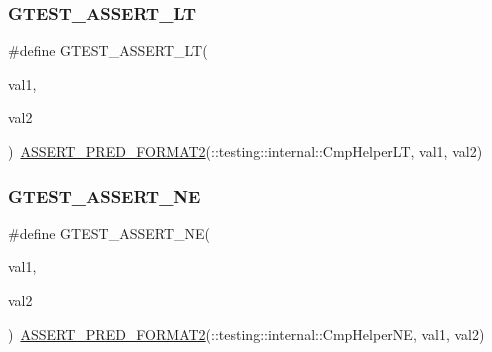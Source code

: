 \mbox{\label{_obj__test_2lib_2googletest-release-1_88_81_2googletest_2include_2gtest_2gtest_8h_a5a75667e637febd18e5f7d4f3abf55e8}} 
\subsubsection{\texorpdfstring{GTEST\_ASSERT\_LT}{GTEST\_ASSERT\_LT}}
{\footnotesize\ttfamily \#define G\+T\+E\+S\+T\+\_\+\+A\+S\+S\+E\+R\+T\+\_\+\+LT(\begin{DoxyParamCaption}\item[{}]{val1,  }\item[{}]{val2 }\end{DoxyParamCaption})~\mbox{\hyperlink{_obj__test_2lib_2googletest-release-1_88_81_2googletest_2include_2gtest_2gtest__pred__impl_8h_ac452685a1a98ea3d96eb956a062ee210}{A\+S\+S\+E\+R\+T\+\_\+\+P\+R\+E\+D\+\_\+\+F\+O\+R\+M\+A\+T2}}(\+::testing\+::internal\+::\+Cmp\+Helper\+LT, val1, val2)}

\mbox{\label{_obj__test_2lib_2googletest-release-1_88_81_2googletest_2include_2gtest_2gtest_8h_a6fa9bb2b6731eba8f481e40e9e4931b3}} 
\subsubsection{\texorpdfstring{GTEST\_ASSERT\_NE}{GTEST\_ASSERT\_NE}}
{\footnotesize\ttfamily \#define G\+T\+E\+S\+T\+\_\+\+A\+S\+S\+E\+R\+T\+\_\+\+NE(\begin{DoxyParamCaption}\item[{}]{val1,  }\item[{}]{val2 }\end{DoxyParamCaption})~\mbox{\hyperlink{_obj__test_2lib_2googletest-release-1_88_81_2googletest_2include_2gtest_2gtest__pred__impl_8h_ac452685a1a98ea3d96eb956a062ee210}{A\+S\+S\+E\+R\+T\+\_\+\+P\+R\+E\+D\+\_\+\+F\+O\+R\+M\+A\+T2}}(\+::testing\+::internal\+::\+Cmp\+Helper\+NE, val1, val2)}

\mbox{\label{_obj__test_2lib_2googletest-release-1_88_81_2googletest_2include_2gtest_2gtest_8h_a636231436707c30d6778f79ae96f5dc6}} 
